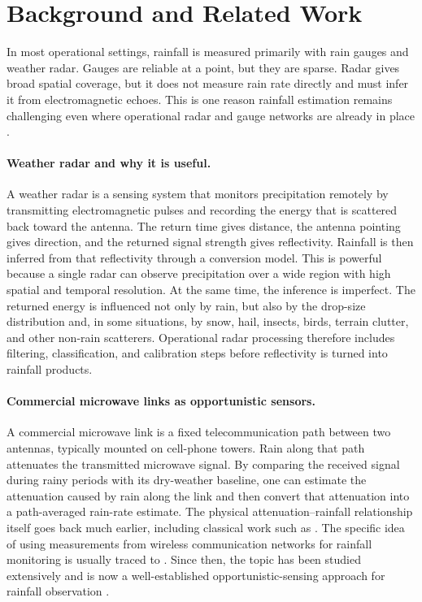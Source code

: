 \documentclass[11pt]{article}
\begin{document}
\section{Background and Related Work}
In most operational settings, rainfall is measured primarily with rain gauges and weather radar. Gauges are reliable at a point, but they are sparse. Radar gives broad spatial coverage, but it does not measure rain rate directly and must infer it from electromagnetic echoes. This is one reason rainfall estimation remains challenging even where operational radar and gauge networks are already in place \citep{olsson2025societal}.

\paragraph*{Weather radar and why it is useful.} A weather radar is a sensing system that monitors precipitation remotely by transmitting electromagnetic pulses and recording the energy that is scattered back toward the antenna. The return time gives distance, the antenna pointing gives direction, and the returned signal strength gives reflectivity. Rainfall is then inferred from that reflectivity through a conversion model. This is powerful because a single radar can observe precipitation over a wide region with high spatial and temporal resolution. At the same time, the inference is imperfect. The returned energy is influenced not only by rain, but also by the drop-size distribution and, in some situations, by snow, hail, insects, birds, terrain clutter, and other non-rain scatterers. Operational radar processing therefore includes filtering, classification, and calibration steps before reflectivity is turned into rainfall products.

\paragraph*{Commercial microwave links as opportunistic sensors.} A commercial microwave link is a fixed telecommunication path between two antennas, typically mounted on cell-phone towers. Rain along that path attenuates the transmitted microwave signal. By comparing the received signal during rainy periods with its dry-weather baseline, one can estimate the attenuation caused by rain along the link and then convert that attenuation into a path-averaged rain-rate estimate. The physical attenuation--rainfall relationship itself goes back much earlier, including classical work such as \citet{olsen1978rain}. The specific idea of using measurements from wireless communication networks for rainfall monitoring is usually traced to \citet{messer2006environmental}. Since then, the topic has been studied extensively and is now a well-established opportunistic-sensing approach for rainfall observation \citep{goldshtein2009rain,chwala2019cml,olsson2025societal}.
\end{document}
